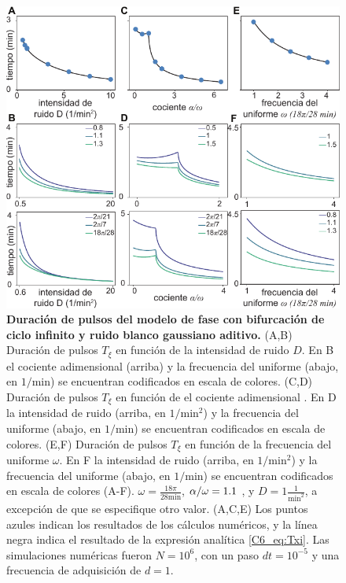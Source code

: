 \documentclass[./main.tex]{subfiles}
\begin{document}
\begin{figure}
    \centering
    \includegraphics[width=1\columnwidth]{figures/chapter6/C6_duration.pdf} 
    \caption{\textbf{Duración de pulsos del modelo de fase con bifurcación de ciclo infinito y ruido blanco gaussiano aditivo.} (A,B) Duración de pulsos $T_\xi$ en función de la intensidad de ruido $D$. En B el cociente adimensional \dddelta (arriba) y la frecuencia del uniforme (abajo, en $1/\text{min}$) se encuentran codificados en escala de colores. (C,D) Duración de pulsos $T_\xi$ en función de el cociente adimensional \dddelta. En D la intensidad de ruido (arriba, en $1/\text{min}^2$) y la frecuencia del uniforme (abajo, en $1/\text{min}$) se encuentran codificados en escala de colores. (E,F) Duración de pulsos $T_\xi$ en función de la frecuencia del uniforme $\omega$. En F la intensidad de ruido (arriba, en $1/\text{min}^2$) y la frecuencia del uniforme (abajo, en $1/\text{min}$) se encuentran codificados en escala de colores (A-F). $\omega = \frac{18\pi}{28 \text{min}}$, $\alpha/\omega = 1.1$ , y $D = 1 \frac{1}{\text{min}^2}$, a excepción de que se especifique otro valor. (A,C,E)  Los puntos azules indican los resultados de los cálculos numéricos, y la línea negra indica el resultado de la expresión analítica \ref{C6_eq:Txi}. Las simulaciones numéricas fueron $N=10^6$, con un paso $dt = 10^{-5}$ y una frecuencia de adquisición de $d=1$.}
    \label{C6_fig:duration}
\end{figure}
\end{document}
